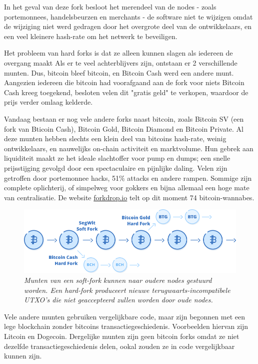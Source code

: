 In het geval van deze fork besloot het merendeel van de nodes - zoals portemonnees, handelsbeurzen en merchants - de software niet te wijzigen omdat de wijziging niet werd gedragen door het overgrote deel van de ontwikkelaars, en een veel kleinere hash-rate om het netwerk te beveiligen. 

Het probleem van hard forks is dat ze alleen kunnen slagen als iedereen de overgang maakt Als er te veel achterblijvers zijn, ontstaan er 2 verschillende munten. Dus, bitcoin bleef bitcoin, en Bitcoin Cash werd een andere munt. Aangezien iedereen die bitcoin had voorafgaand aan de fork voor niets Bitcoin Cash kreeg toegekend, besloten velen dit "gratis geld" te verkopen, waardoor de prijs verder omlaag kelderde.

Vandaag bestaan er nog vele andere forks naast bitcoin, zoals Bitcoin SV (een fork van Bticoin Cash), Bitcoin Gold, Bitcoin Diamond en Bitcoin Private. Al deze munten hebben slechts een klein deel van bitcoins hash-rate, weinig ontwikkelaars, en nauwelijks on-chain activiteit en marktvolume. Hun gebrek aan liquiditeit maakt ze het ideale slachtoffer voor pump en dumps; een snelle prijsstijging gevolgd door een spectaculaire en pijnlijke daling. Velen zijn getroffen door portemonnee hacks, 51\% attacks en andere rampen. Sommige zijn complete oplichterij, of simpelweg voor gokkers en bijna allemaal een hoge mate van centralisatie. De website \href{https://forkdrop.io/}{forkdrop.io} telt op dit moment 74 bitcoin-wannabes.

\begin{figure}
    \centering
    \includegraphics[width=\textwidth]{images/fig15.png}
    \caption{\footnotesize{\textit{Munten van een soft-fork kunnen naar oudere nodes gestuurd worden. Een hard-fork produceert nieuwe terugwaarts-incompatibele UTXO's die niet geaccepteerd zullen worden door oude nodes.}}}
    \label{fig15}
\end{figure}

Vele andere munten gebruiken vergelijkbare code, maar zijn begonnen met een lege blockchain zonder bitcoins transactiegeschiedenis. Voorbeelden hiervan zijn Litcoin en Dogecoin. Dergelijke munten zijn geen bitcoin forks omdat ze niet dezelfde transactiegeschiedenis delen, ookal zouden ze in code vergelijkbaar kunnen zijn. 

